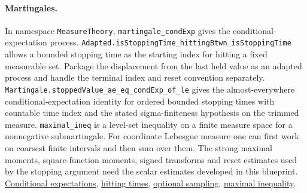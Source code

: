 \documentclass[11pt,letterpaper]{article}
\theoremstyle{definition}
\begin{document}
\paragraph{Martingales.}
In namespace \nolinkurl{MeasureTheory}, \nolinkurl{martingale_condExp} gives the conditional-expectation process. \nolinkurl{Adapted.isStoppingTime_hittingBtwn_isStoppingTime} allows a bounded stopping time as the starting index for hitting a fixed measurable set. Package the displacement from the last held value as an adapted process and handle the terminal index and reset convention separately. \nolinkurl{Martingale.stoppedValue_ae_eq_condExp_of_le} gives the almost-everywhere conditional-expectation identity for ordered bounded stopping times with countable time index and the stated sigma-finiteness hypothesis on the trimmed measure. \nolinkurl{maximal_ineq} is a level-set inequality on a finite measure space for a nonnegative submartingale. For coordinate Lebesgue measure one can first work on coarsest finite intervals and then sum over them. The strong maximal moments, square-function moments, signed transforms and reset estimates used by the stopping argument need the scalar estimates developed in this blueprint. \href{https://github.com/leanprover-community/mathlib4/blob/c55e6e786f49471c72fbddbec5415808896aec1e/Mathlib/Probability/Martingale/Basic.lean#L141}{Conditional expectations}, \href{https://github.com/leanprover-community/mathlib4/blob/c55e6e786f49471c72fbddbec5415808896aec1e/Mathlib/Probability/Process/HittingTime.lean#L433}{hitting times}, \href{https://github.com/leanprover-community/mathlib4/blob/c55e6e786f49471c72fbddbec5415808896aec1e/Mathlib/Probability/Martingale/OptionalSampling.lean#L141}{optional sampling}, \href{https://github.com/leanprover-community/mathlib4/blob/c55e6e786f49471c72fbddbec5415808896aec1e/Mathlib/Probability/Martingale/OptionalStopping.lean#L144}{maximal inequality}.
\end{document}
